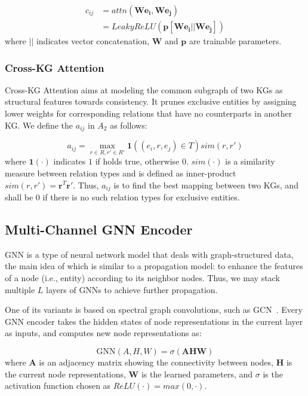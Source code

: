 \documentclass[11pt,a4paper]{article}
\begin{document}
\begin{equation}
	\begin{split}
		c_{ij} &= attn(\mathbf{W} \mathbf{e_i}, \mathbf{W} \mathbf{e_j}) \\
		&= LeakyReLU(\mathbf{p}[\mathbf{W} \mathbf{e_i} || \mathbf{W} \mathbf{e_j}])
	\end{split}
\end{equation}
where $||$ indicates vector concatenation, $\mathbf{W}$ and $\mathbf{p}$ are trainable parameters.

\subsubsection*{Cross-KG Attention}
Cross-KG Attention aims at modeling the common subgraph of two KGs as structural features towards consistency. It prunes exclusive entities by assigning lower weights for corresponding relations that have no counterparts in another KG. We define the $a_{ij}$ in $A_2$ as follows:

\begin{equation}
	a_{ij} = \underset{r\in R,r'\in R'}{\max} \mathbf{1}((e_i,r,e_j)\in T) sim(r, r')
\end{equation}
where $\mathbf{1}(\cdot)$ indicates $1$ if holds true, otherwise 0. $sim(\cdot)$ is a similarity measure between relation types and is defined as inner-product $sim(r, r')=\mathbf{r}^T\mathbf{r}'$. Thus, $a_{ij}$ is to find the best mapping between two KGs, and shall be $0$ if there is no such relation types for exclusive entities.

\subsection{Multi-Channel GNN Encoder}

GNN is a type of neural network model that deals with graph-structured data, the main idea of which is similar to a propagation model: to enhance the features of a node (i.e., entity) according to its neighbor nodes. Thus, we may stack multiple $L$ layers of GNNs to achieve further propagation.

One of its variants is based on spectral graph convolutions, such as GCN~\cite{kipf2016semi}. Every GNN encoder takes the hidden states of node representations in the current layer as inputs, and computes new node representations as:

\begin{equation} \label{eq:gat}
	\text{GNN}(A,H,W) = \sigma(\mathbf{A} \mathbf{H} \mathbf{W})
\end{equation}
where $\mathbf{A}$ is an adjacency matrix showing the connectivity between nodes, $\mathbf{H}$ is the current node representations, $\mathbf{W}$ is the learned parameters, and $\sigma$ is the activation function chosen as $ReLU(\cdot) = max(0, \cdot)$.
\end{document}
